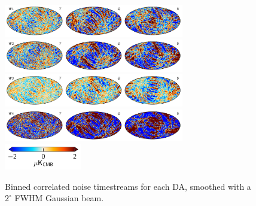 \documentclass[twocolumn]{../../common/aa}
\begin{document}
\begin{figure}
	\includegraphics[width=0.7\textwidth]{figures/tod_ncorr_W1_IQU.pdf}\\
	\includegraphics[width=0.7\textwidth]{figures/tod_ncorr_W2_IQU.pdf}\\
	\includegraphics[width=0.7\textwidth]{figures/tod_ncorr_W3_IQU.pdf}\\
	\includegraphics[width=0.7\textwidth]{figures/tod_ncorr_W4_IQU.pdf}\\
	\includegraphics[width=0.30\textwidth]{figures/cbar_2uK_4in.pdf}
	\caption{Binned correlated noise timestreams for each DA, smoothed with a $2^\circ$ FWHM Gaussian beam.}
        \label{fig:ncorr}
\end{figure}
\end{document}
